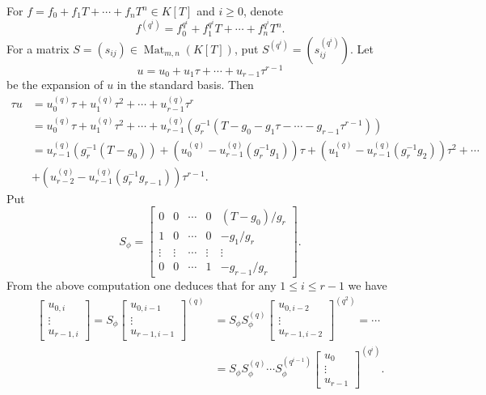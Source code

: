 \documentclass[12pt]{amsart}
\theoremstyle{definition}
\theoremstyle{remark}
\numberwithin{equation}{section}
\numberwithin{thm}{section}
\DeclareMathOperator{\Mat}{Mat}
\begin{document}
 For $f=f_0+f_1T+\cdots+f_nT^n\in K[T]$ and $i\geq 0$, denote $$f^{(q^i)} = f_0^{q^i}+f_1^{q^i}T+\cdots+f_n^{q^i}T^n.$$  
 For a matrix $S=(s_{ij})\in \Mat_{m, n}(K[T])$, put $S^{(q^i)}=\left(s_{ij}^{(q^i)}\right)$. 
 Let $$u=u_0+u_1\tau+\cdots+u_{r-1}\tau^{r-1}$$ be the expansion of $u$ in the standard basis. Then 
 \begin{align*}
 	\tau u & = u_0^{(q)}\tau+u_1^{(q)}\tau^2+\cdots+u_{r-1}^{(q)}\tau^r \\ 
 	& = u_0^{(q)}\tau+u_1^{(q)}\tau^2+\cdots+u_{r-1}^{(q)}(g_r^{-1}(T-g_0-g_1\tau-\cdots-g_{r-1}\tau^{r-1})) \\ 
 	& = u_{r-1}^{(q)}(g_r^{-1}(T-g_0)) + (u_0^{(q)}-u_{r-1}^{(q)}(g_r^{-1}g_1)) \tau+(u_1^{(q)}-u_{r-1}^{(q)}(g_r^{-1}g_2)) \tau^2+\cdots \\ &+
 	(u_{r-2}^{(q)}-u_{r-1}^{(q)}(g_r^{-1}g_{r-1})) \tau^{r-1}. 
 \end{align*}
 Put 
 \begin{equation}\label{eqSphi}
 	S_\phi=\begin{bmatrix} 
 		0 & 0 &\cdots & 0 &(T-g_0)/g_r \\ 
 		1 & 0 & \cdots & 0 &-g_1/g_r \\ 
 		\vdots & \vdots& \cdots &\vdots & \vdots \\ 
 		0 & 0 &\cdots & 1 & -g_{r-1}/g_r
 	\end{bmatrix}. 
 \end{equation}
 From the above computation one deduces that for any $1\leq i\leq r-1$ we have 
 \begin{align*}
 	\begin{bmatrix} u_{0,i}\\ \vdots \\ u_{r-1, i}\end{bmatrix} = 	S_\phi \begin{bmatrix} u_{0, i-1}\\ \vdots\\ u_{r-1, i-1}\end{bmatrix}^{(q)} & = 
 	S_\phi S_\phi^{(q)}  \begin{bmatrix} u_{0, i-2}\\ \vdots\\ u_{r-1, i-2}\end{bmatrix}^{(q^2)} = \cdots \\ &= 
 	S_\phi S_\phi^{(q)} \cdots  S_\phi^{(q^{i-1})} \begin{bmatrix} u_{0}\\ \vdots\\ u_{r-1}\end{bmatrix}^{(q^i)}. 
 \end{align*}
\end{document}

